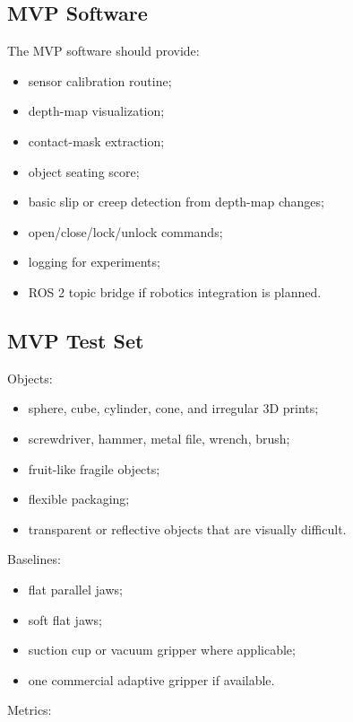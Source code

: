 \documentclass[11pt]{article}
\begin{document}
\subsection{MVP Software}

The MVP software should provide:

\begin{itemize}[leftmargin=*]
  \item sensor calibration routine;
  \item depth-map visualization;
  \item contact-mask extraction;
  \item object seating score;
  \item basic slip or creep detection from depth-map changes;
  \item open/close/lock/unlock commands;
  \item logging for experiments;
  \item ROS 2 topic bridge if robotics integration is planned.
\end{itemize}

\subsection{MVP Test Set}

Objects:

\begin{itemize}[leftmargin=*]
  \item sphere, cube, cylinder, cone, and irregular 3D prints;
  \item screwdriver, hammer, metal file, wrench, brush;
  \item fruit-like fragile objects;
  \item flexible packaging;
  \item transparent or reflective objects that are visually difficult.
\end{itemize}

Baselines:

\begin{itemize}[leftmargin=*]
  \item flat parallel jaws;
  \item soft flat jaws;
  \item suction cup or vacuum gripper where applicable;
  \item one commercial adaptive gripper if available.
\end{itemize}

Metrics:
\end{document}
